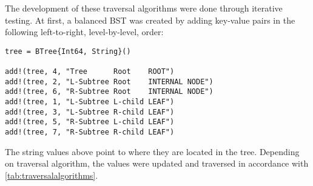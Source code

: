 \documentclass[a4paper, 11pt]{article}
\begin{document}
    The development of these traversal algorithms were done 
    through iterative testing. 
    At first, a balanced BST was created by adding key-value pairs in the following 
    left-to-right, level-by-level, order: 
    \begin{verbatim}
tree = BTree{Int64, String}()

add!(tree, 4, "Tree      Root    ROOT")
add!(tree, 2, "L-Subtree Root    INTERNAL NODE")
add!(tree, 6, "R-Subtree Root    INTERNAL NODE")
add!(tree, 1, "L-Subtree L-child LEAF")
add!(tree, 3, "L-Subtree R-child LEAF")
add!(tree, 5, "R-Subtree L-child LEAF")
add!(tree, 7, "R-Subtree R-child LEAF")
    \end{verbatim}
    The string values above point to where they are located in the tree. 
    Depending on traversal algorithm, the values were updated and traversed in accordance 
    with \autoref{tab:traversalalgorithms}.
\end{document}
